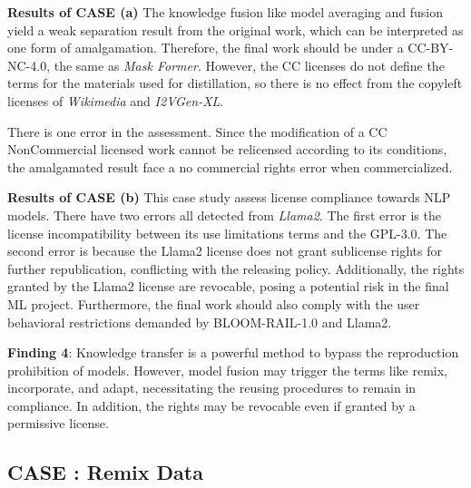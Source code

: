 \textbf{Results of CASE  (a)}
The knowledge fusion like model averaging and fusion yield a weak separation result from the original work, which can be interpreted as one form of amalgamation.
Therefore, the final work should be under a CC-BY-NC-4.0, the same as \textit{Mask Former}.
However, the CC licenses do not define the terms for the materials used for distillation, so there is no effect from the copyleft licenses of \textit{Wikimedia} and \textit{I2VGen-XL}.
 
There is one error in the assessment. 
Since the modification of a CC NonCommercial licensed work cannot be relicensed according to its conditions, the amalgamated result face a no commercial rights error when commercialized.

\textbf{Results of CASE  (b)}
This case study assess license compliance towards NLP models.
There have two errors all detected from \textit{Llama2}.
The first error is the license incompatibility between its use limitations terms and the GPL-3.0.
The second error is because the Llama2 license does not grant sublicense rights for further republication, conflicting with the releasing policy.
Additionally, the rights granted by the Llama2 license are revocable, posing a potential risk in the final ML project.
Furthermore, the final work should also comply with the user behavioral restrictions demanded by BLOOM-RAIL-1.0 and Llama2.

\begin{tcolorbox}
\textbf{Finding 4}: Knowledge transfer is a powerful method to bypass the reproduction prohibition of models. 
However, model fusion may trigger the terms like remix, incorporate, and adapt, necessitating the reusing procedures to remain in compliance.
In addition, the rights may be revocable even if granted by a permissive license.
\end{tcolorbox}

\subsection{CASE  : Remix Data}

